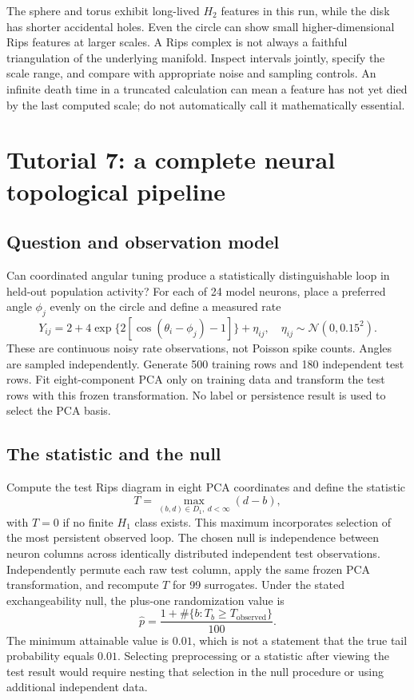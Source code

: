 The sphere and torus exhibit long-lived $H_2$ features in this run, while the disk has shorter accidental holes. Even the circle can show small higher-dimensional Rips features at larger scales. A Rips complex is not always a faithful triangulation of the underlying manifold. Inspect intervals jointly, specify the scale range, and compare with appropriate noise and sampling controls. An infinite death time in a truncated calculation can mean a feature has not yet died by the last computed scale; do not automatically call it mathematically essential.

\section{Tutorial 7: a complete neural topological pipeline}
\subsection{Question and observation model}
Can coordinated angular tuning produce a statistically distinguishable loop in held-out population activity? For each of 24 model neurons, place a preferred angle $\phi_j$ evenly on the circle and define a measured rate
\begin{equation}
Y_{ij}=2+4\exp\{2[\cos(\theta_i-\phi_j)-1]\}+\eta_{ij},
\quad\eta_{ij}\sim\mathcal N(0,0.15^2).
\end{equation}
These are continuous noisy rate observations, not Poisson spike counts. Angles are sampled independently. Generate 500 training rows and 180 independent test rows. Fit eight-component PCA only on training data and transform the test rows with this frozen transformation. No label or persistence result is used to select the PCA basis.

\subsection{The statistic and the null}
Compute the test Rips diagram in eight PCA coordinates and define the statistic
\begin{equation}
T=\max_{(b,d)\in D_1,\ d<\infty}(d-b),
\end{equation}
with $T=0$ if no finite $H_1$ class exists. This maximum incorporates selection of the most persistent observed loop. The chosen null is independence between neuron columns across identically distributed independent test observations. Independently permute each raw test column, apply the same frozen PCA transformation, and recompute $T$ for 99 surrogates. Under the stated exchangeability null, the plus-one randomization value is
\begin{equation}
\widehat p=\frac{1+\#\{b:T_b\geq T_{\mathrm{observed}}\}}{100}.
\end{equation}
The minimum attainable value is $0.01$, which is not a statement that the true tail probability equals $0.01$. Selecting preprocessing or a statistic after viewing the test result would require nesting that selection in the null procedure or using additional independent data.

